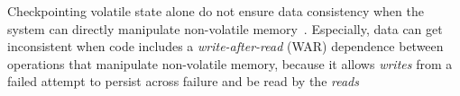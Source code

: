 Checkpointing volatile state alone do not ensure data consistency when the
system can directly manipulate non-volatile memory~\cite{mspcdino}.
Especially, data can get inconsistent when code includes a
\emph{write-after-read} (WAR) dependence between operations that manipulate
non-volatile memory, because it allows {\em writes} from a failed attempt to
persist across failure and be read by the {\em
reads}~\cite{ratchet,dino,alpaca}


